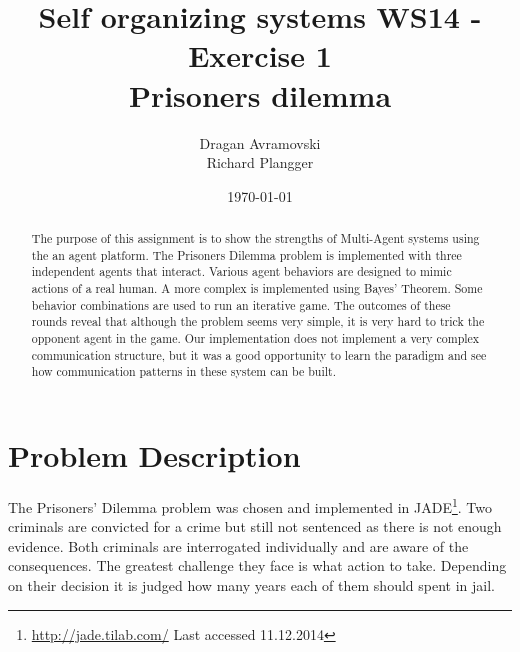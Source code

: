 \documentclass{acm_proc_article-sp}
\begin{document}
\title{Self organizing systems WS14 - Exercise 1\\
       Prisoners dilemma}%

\author{
\alignauthor
Dragan Avramovski\\
\alignauthor
Richard Plangger\\
}

\date{\today}

\maketitle

\begin{abstract}
 The purpose of this assignment is to show the strengths of Multi-Agent systems using the an agent platform. The Prisoners Dilemma problem is implemented with three independent agents that interact. Various agent behaviors are designed to mimic actions of a real human. A more complex is implemented using Bayes' Theorem. Some behavior combinations 
 are used to run an iterative game. The outcomes of these rounds reveal that although the problem seems very simple, it is very hard to trick the opponent agent in the game. Our
 implementation does not implement a very complex communication structure, but it
 was a good opportunity to learn the paradigm and see how communication patterns in
 these system can be built.
\end{abstract}



\section{Problem Description}
\label{sec:problem-desc}

The Prisoners' Dilemma problem was chosen and implemented in JADE\footnote{\url{http://jade.tilab.com/} Last accessed 11.12.2014}. Two criminals are convicted for a crime but still not sentenced as there is not enough evidence. Both criminals are interrogated individually and are aware of the consequences. The greatest challenge they face is what action to take. Depending on their decision it is judged how many
years each of them should spent in jail. 
\end{document}
